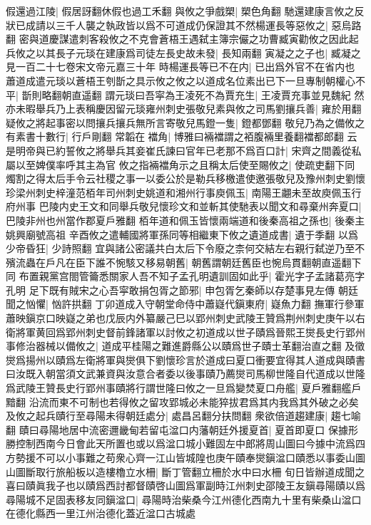 假還過江陵|{
	假居訝翻休假也過工禾翻}
與攸之爭戲槊|{
	槊色角翻}
馳還建康言攸之反狀已成請以三千人襲之執政皆以爲不可道成仍保證其不然楊運長等惡攸之|{
	惡烏路翻}
密與道慶謀遣刺客殺攸之不克會蒼梧王遇弑主簿宗儼之功曹臧寅勸攸之因此起兵攸之以其長子元琰在建康爲司徒左長史故未發|{
	長知兩翻}
寅凝之之子也|{
	臧凝之見一百二十七卷宋文帝元嘉三十年}
時楊運長等已不在内|{
	已出爲外官不在省内也}
蕭道成遣元琰以蒼梧王刳斮之具示攸之攸之以道成名位素出已下一旦專制朝權心不平|{
	斮則略翻朝直遥翻}
謂元琰曰吾寜為王凌死不為賈充生|{
	王凌賈充事並見魏紀}
然亦未暇舉兵乃上表稱慶因留元琰雍州刺史張敬兒素與攸之司馬劉攘兵善|{
	雍於用翻}
疑攸之將起事密以問攘兵攘兵無所言寄敬兒馬鐙一隻|{
	鐙都鄧翻}
敬兒乃為之備攸之有素書十數行|{
	行戶剛翻}
常韜在襠角|{
	博雅曰裲襠謂之袹腹裲里養翻襠都郎翻}
云是明帝與已約誓攸之將舉兵其妾崔氏諫曰官年已老那不爲百口計|{
	宋齊之間義從私屬以至婢僕率呼其主為官}
攸之指裲襠角示之且稱太后使至賜攸之|{
	使疏吏翻下同}
燭割之得太后手令云社稷之事一以委公於是勒兵移檄遣使邀張敬兒及豫州刺史劉懷珍梁州刺史梓潼范栢年司州刺史姚道和湘州行事庾佩玉|{
	南陽王翽未至故庾佩玉行府州事}
巴陵内史王文和同舉兵敬兒懷珍文和並斬其使馳表以聞文和尋棄州奔夏口|{
	巴陵非州也州當作郡夏戶雅翻}
栢年道和佩玉皆懷兩端道和後秦高祖之孫也|{
	後秦主姚興廟號高祖}
辛酉攸之遣輔國將軍孫同等相繼東下攸之遺道成書|{
	遺于季翻}
以爲少帝昏狂|{
	少詩照翻}
宜與諸公密議共白太后下令廢之柰何交結左右親行弑逆乃至不殯流蟲在戶凡在臣下誰不惋駭又移易朝舊|{
	朝舊謂朝廷舊臣也惋烏貫翻朝直遥翻下同}
布置親黨宫閤管籥悉關家人吾不知子孟孔明遺訓固如此乎|{
	霍光字子孟諸葛亮字孔明}
足下既有賊宋之心吾寜敢捐包胥之節邪|{
	申包胥乞秦師以存楚事見左傳}
朝廷聞之忷懼|{
	忷許拱翻}
丁卯道成入守朝堂命侍中蕭嶷代鎭東府|{
	嶷魚力翻}
撫軍行參軍蕭映鎭京口映嶷之弟也戊辰内外纂嚴己巳以郢州刺史武陵王贊爲荆州刺史庚午以右衛將軍黄回爲郢州刺史督前鋒諸軍以討攸之初道成以世子賾爲晉熙王爕長史行郢州事修治器械以備攸之|{
	道成平桂陽之難進爵縣公以賾爲世子賾士革翻治直之翻}
及徵爕爲揚州以賾爲左衛將軍與爕俱下劉懷珍言於道成曰夏口衝要宜得其人道成與賾書曰汝既入朝當須文武兼資與汝意合者委以後事賾乃薦爕司馬柳世隆自代道成以世隆爲武陵王贊長史行郢州事賾將行謂世隆曰攸之一旦爲變焚夏口舟艦|{
	夏戶雅翻艦戶黯翻}
沿流而東不可制也若得攸之留攻郢城必未能猝拔君爲其内我爲其外破之必矣及攸之起兵賾行至尋陽未得朝廷處分|{
	處昌呂翻分扶問翻}
衆欲倍道趨建康|{
	趨七喻翻}
賾曰尋陽地居中流密邇畿甸若留屯湓口内藩朝廷外援夏首|{
	夏首即夏口}
保據形勝控制西南今日會此天所置也或以爲湓口城小難固左中郎將周山圖曰今據中流爲四方勢援不可以小事難之苟衆心齊一江山皆城隍也庚午賾奉爕鎭湓口賾悉以事委山圖山圖斷取行旅船板以造樓櫓立水柵|{
	斷丁管翻立柵於水中曰水柵}
旬日皆辦道成聞之喜曰賾眞我子也以賾爲西討都督賾啓山圖爲軍副時江州刺史邵陵王友鎭尋陽賾以爲尋陽城不足固表移友同鎭湓口|{
	尋陽時治柴桑今江州德化西南九十里有柴桑山湓口在德化縣西一里江州治德化蓋近湓口古城處}

